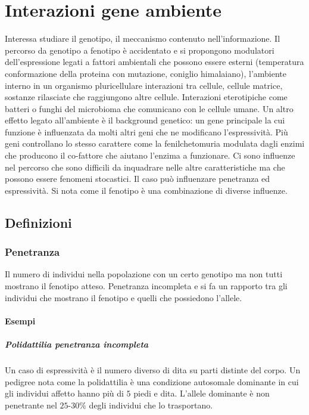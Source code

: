 \chapter{Interazioni gene ambiente}
Interessa studiare il genotipo, il meccanismo contenuto nell'informazione. Il percorso da genotipo a fenotipo \`e accidentato e si propongono modulatori dell'espressione legati a fattori
ambientali che possono essere esterni (temperatura conformazione della proteina con mutazione, coniglio himalaiano), l'ambiente interno in un organismo pluricellulare interazioni tra
cellule, cellule matrice, sostanze rilasciate che raggiungono altre cellule. Interazioni eterotipiche come batteri o funghi del microbioma che comunicano con le cellule umane. Un
altro effetto legato all'ambiente \`e il background genetico: un gene principale la cui funzione \`e influenzata da molti altri geni che ne modificano l'espressivit\`a. Pi\`u geni
controllano lo stesso carattere come la fenilchetomuria modulata dagli enzimi che producono il co-fattore che aiutano l'enzima a funzionare. Ci sono influenze nel percorso che sono
difficili da inquadrare nelle altre caratteristiche ma che possono essere fenomeni stocastici. Il caso pu\`o influenzare penetranza ed espressivit\`a. Si nota come il fenotipo 
\`e una combinazione di diverse influenze.
\section{Definizioni}
\subsection{Penetranza}
Il numero di individui nella popolazione con un certo genotipo ma non tutti mostrano il fenotipo atteso. Penetranza incompleta e si fa un rapporto tra gli individui che mostrano il 
fenotipo e quelli che possiedono l'allele. 
\subsubsection{Esempi}
\paragraph{Polidattilia penetranza incompleta}
Un caso di espressivit\`a \`e il numero diverso di dita su parti distinte del corpo. Un pedigree nota come la polidattilia \`e una condizione autosomale dominante in cui gli individui 
affetto hanno pi\`u di $5$ piedi e dita. L'allele dominante \`e non penetrante nel $25$-$30\%$ degli individui che lo trasportano. 
